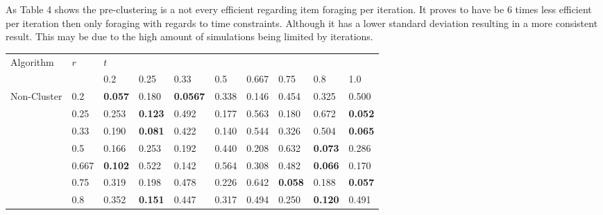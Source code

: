\documentclass[12pt]{article}
\begin{document}
\par{As Table 4 shows the pre-clustering is a not every efficient regarding item foraging per iteration. It proves to have be $6$ times less efficient per iteration then only foraging with regards to time constraints. Although it has a lower standard deviation resulting in a more consistent result. This may be due to the high amount of simulations being limited by iterations.}
\\
\begin{table}[h]
\centering
\begin{tabular}{|l|l|l|l|l|l|l|l|l|l|}
\hline
\multirow{2}{*}{Algorithm}                         & \multirow{2}{*}{\hspace{0.017\linewidth}$r$} & \multicolumn{8}{l|}{\hspace{0.28\linewidth} $t$}                                                                                         \\ \cline{3-10} 
                                                   &                    & 0.2         & 0.25        & 0.33         & 0.5         & 0.667       & 0.75        & 0.8         & 1.0         \\ \hline
\multirow{8}{*}{Non-Cluster}                       & 0.2                & {\bf 0.057} & 0.180       & {\bf 0.0567} & 0.338       & 0.146       & 0.454       & 0.325       & 0.500       \\
                                                   & 0.25               & 0.253       & {\bf 0.123} & 0.492        & 0.177       & 0.563       & 0.180       & 0.672       & {\bf 0.052} \\
                                                   & 0.33               & 0.190       & {\bf 0.081} & 0.422        & 0.140       & 0.544       & 0.326       & 0.504       & {\bf 0.065} \\
                                                   & 0.5                & 0.166       & 0.253       & 0.192        & 0.440       & 0.208       & 0.632       & {\bf 0.073} & 0.286       \\
                                                   & 0.667              & {\bf 0.102} & 0.522       & 0.142        & 0.564       & 0.308       & 0.482       & {\bf 0.066} & 0.170       \\
                                                   & 0.75               & 0.319       & 0.198       & 0.478        & 0.226       & 0.642       & {\bf 0.058} & 0.188       & {\bf 0.057} \\
                                                   & 0.8                & 0.352       & {\bf 0.151} & 0.447        & 0.317       & 0.494       & 0.250       & {\bf 0.120} & 0.491       \\

\end{tabular}
\end{table}
\end{document}
